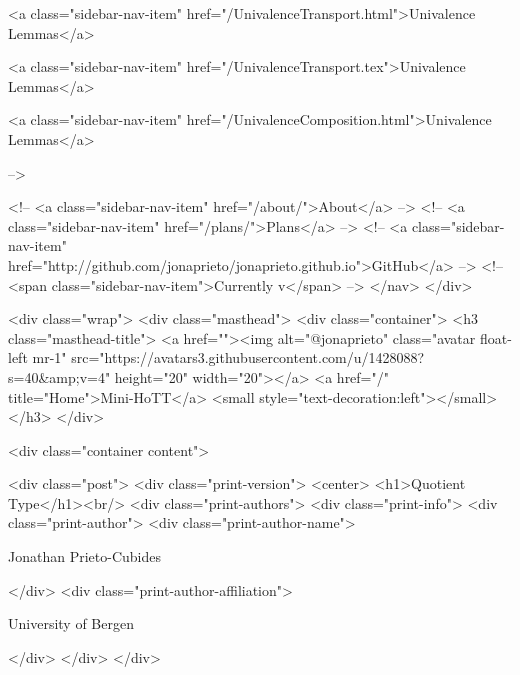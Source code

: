      
    
      
        
          <a class="sidebar-nav-item" href="/UnivalenceTransport.html">Univalence Lemmas</a>
        
      
    
      
        
          <a class="sidebar-nav-item" href="/UnivalenceTransport.tex">Univalence Lemmas</a>
        
      
    
      
        
          <a class="sidebar-nav-item" href="/UnivalenceComposition.html">Univalence Lemmas</a>
        
      
     -->

    <!-- <a class="sidebar-nav-item" href="/about/">About</a> -->
    <!-- <a class="sidebar-nav-item" href="/plans/">Plans</a> -->
    <!-- <a class="sidebar-nav-item" href="http://github.com/jonaprieto/jonaprieto.github.io">GitHub</a> -->
    <!-- <span class="sidebar-nav-item">Currently v</span> -->
  </nav>
</div>

    <div class="wrap">
      <div class="masthead">
        <div class="container">
          <h3 class="masthead-title">
            <a href=""><img alt="@jonaprieto" class="avatar float-left mr-1" src="https://avatars3.githubusercontent.com/u/1428088?s=40&amp;v=4" height="20" width="20"></a>
            <a href="/" title="Home">Mini-HoTT</a>
            <small style="text-decoration:left"></small>
          </h3>
        </div>
      
      <div class="container content">
        







<div class="post">
  <div class="print-version">
    <center>
      <h1>Quotient Type</h1><br/>
        <div class="print-authors">
          <div class="print-info">
            <div class="print-author">
              <div class="print-author-name">
                
                  Jonathan Prieto-Cubides
                
              </div>
              <div class="print-author-affiliation">
                
                  University of Bergen
                
                </div>
            </div>
          </div>
          
